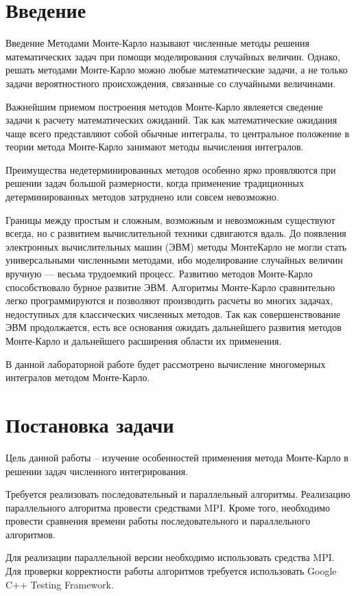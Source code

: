 \documentclass{report}
\begin{document}
\setcounter{page}{2}

\tableofcontents
\newpage

\section*{Введение}
{Введение}
Методами Монте-Карло называют численные методы решения математических задач при помощи моделирования случайных величин. Однако, решать методами Монте-Карло можно любые математические задачи, а не только задачи вероятностного происхождения, связанные со случайными величинами.
\par Важнейшим приемом построения методов Монте-Карло явлеяется сведение задачи к расчету математических ожиданий. Так как математические ожидания чаще всего представляют собой обычные интегралы, то
центральное положение в теории метода Монте-Карло занимают методы вычисления интегралов.
\par Преимущества недетерминированных методов особенно ярко проявляются при решении задач большой размерности, когда применение традиционных детерминированных методов затруднено или совсем невозможно.
\par Границы между простым и сложным, возможным и невозможным существуют всегда, но с развитием вычислительной техники сдвигаются вдаль. До появления электронных вычислительных машин (ЭВМ) методы МонтеКарло не могли стать универсальными численными методами, ибо моделирование случайных величин вручную — весьма трудоемкий процесс. Развитию методов Монте-Карло способствовало бурное развитие ЭВМ. Алгоритмы Монте-Карло сравнительно легко программируются и позволяют производить расчеты во многих задачах, недоступных для классических численных методов. Так как совершенствование ЭВМ продолжается, есть все основания ожидать дальнейшего развития методов Монте-Карло и дальнейшего расширения области их применения.
\par В данной лабораторной работе будет рассмотрено вычисление многомерных интегралов методом Монте-Карло.
\newpage

\section*{Постановка задачи}
Цель данной работы – изучение особенностей применения метода Монте-Карло в решении задач численного интегрирования.
\par Требуется реализовать последовательный и параллельный алгоритмы. Реализацию параллельного алгоритма провести средствами MPI. Кроме того, необходимо провести сравнения времени работы последовательного и параллельного алгоритмов.
\par Для реализации параллельной версии необходимо использовать средства MPI. Для проверки корректности работы алгоритмов требуется использовать Google C++ Testing Framework.
\newpage
\end{document}
